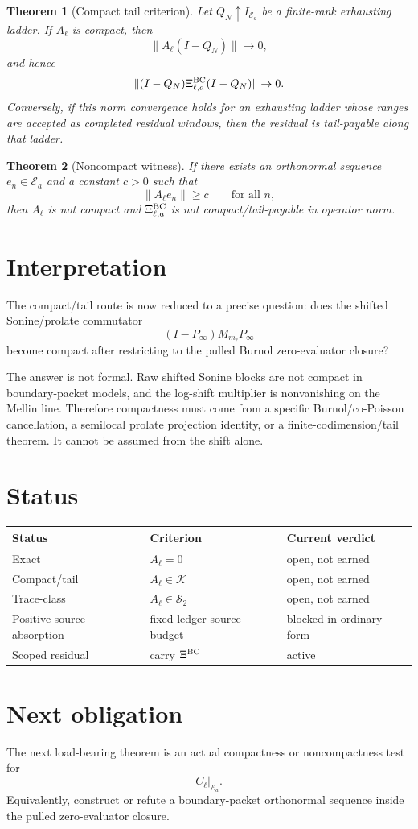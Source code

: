 \documentclass[11pt]{article}
\newtheorem{theorem}{Theorem}
\begin{document}
\begin{theorem}[Compact tail criterion]
Let $Q_N\uparrow I_{\mathcal E_a}$ be a finite-rank exhausting ladder. If $A_\ell$ is compact, then
\[
  \|A_\ell(I-Q_N)\|\to0,
\]
and hence
\[
  \|(I-Q_N)\Xi^{\rm BC}_{\ell,a}(I-Q_N)\|\to0.
\]
Conversely, if this norm convergence holds for an exhausting ladder whose ranges are accepted as completed residual windows, then the residual is tail-payable along that ladder.
\end{theorem}

\begin{theorem}[Noncompact witness]
If there exists an orthonormal sequence $e_n\in\mathcal E_a$ and a constant $c>0$ such that
\[
  \|A_\ell e_n\|\ge c\qquad\text{for all }n,
\]
then $A_\ell$ is not compact and $\Xi^{\rm BC}_{\ell,a}$ is not compact/tail-payable in operator norm.
\end{theorem}

\section{Interpretation}
The compact/tail route is now reduced to a precise question: does the shifted Sonine/prolate commutator
\[
  (I-P_\infty)M_{m_\ell}P_\infty
\]
become compact after restricting to the pulled Burnol zero-evaluator closure?

The answer is not formal. Raw shifted Sonine blocks are not compact in boundary-packet models, and the log-shift multiplier is nonvanishing on the Mellin line. Therefore compactness must come from a specific Burnol/co-Poisson cancellation, a semilocal prolate projection identity, or a finite-codimension/tail theorem. It cannot be assumed from the shift alone.

\section{Status}
\begin{center}
\begin{tabular}{lll}
\toprule
Status & Criterion & Current verdict\\
\midrule
Exact & $A_\ell=0$ & open, not earned\\
Compact/tail & $A_\ell\in\mathcal K$ & open, not earned\\
Trace-class & $A_\ell\in\mathcal S_2$ & open, not earned\\
Positive source absorption & fixed-ledger source budget & blocked in ordinary form\\
Scoped residual & carry $\Xi^{\rm BC}$ & active\\
\bottomrule
\end{tabular}
\end{center}

\section{Next obligation}
The next load-bearing theorem is an actual compactness or noncompactness test for
\[
  C_\ell\big|_{\mathcal E_a}.
\]
Equivalently, construct or refute a boundary-packet orthonormal sequence inside the pulled zero-evaluator closure.
\end{document}
